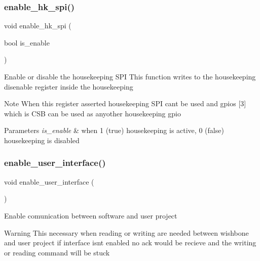 \subsubsection{\texorpdfstring{enable\+\_\+hk\+\_\+spi()}{enable\_hk\_spi()}}
{\footnotesize\ttfamily void enable\+\_\+hk\+\_\+spi (\begin{DoxyParamCaption}\item[{bool}]{is\+\_\+enable }\end{DoxyParamCaption})}

Enable or disable the housekeeping S\+PI This function writes to the housekeeping disenable register inside the housekeeping \begin{DoxyNote}{Note}
When this register asserted housekeeping S\+PI can\textquotesingle{}t be used and gpios \mbox{[}3\mbox{]} which is C\+SB can be used as anyother housekeeping gpio
\end{DoxyNote}

\begin{DoxyParams}{Parameters}
{\em is\+\_\+enable} & when 1 (true) housekeeping is active, 0 (false) housekeeping is disabled \\
\hline
\end{DoxyParams}
\mbox{\label{group__common_gaf79fbe355fd538621db12e3ae9e3e6b8}} 
\subsubsection{\texorpdfstring{enable\+\_\+user\+\_\+interface()}{enable\_user\_interface()}}
{\footnotesize\ttfamily void enable\+\_\+user\+\_\+interface (\begin{DoxyParamCaption}{ }\end{DoxyParamCaption})}

Enable comunication between software and user project \begin{DoxyWarning}{Warning}
This necessary when reading or writing are needed between wishbone and user project if interface isn\textquotesingle{}t enabled no ack would be recieve and the writing or reading command will be stuck 
\end{DoxyWarning}
